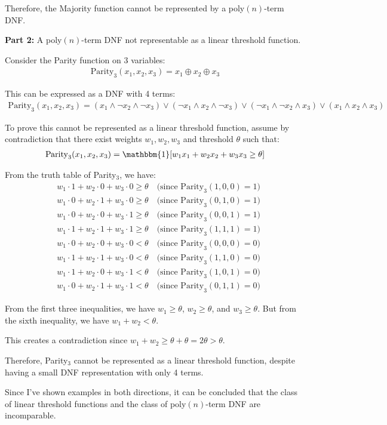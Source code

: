 \documentclass[11pt]{article}
\DeclareMathOperator{\1}{\mathbbm{1}}
\begin{document}
\begin{problem} [15 points]
Therefore, the Majority function cannot be represented by a poly$(n)$-term DNF.

\textbf{Part 2:} A poly$(n)$-term DNF not representable as a linear threshold function.

Consider the Parity function on 3 variables:
\begin{align}
\text{Parity}_3(x_1, x_2, x_3) = x_1 \oplus x_2 \oplus x_3
\end{align}

This can be expressed as a DNF with 4 terms:
\begin{align}
\text{Parity}_3(x_1, x_2, x_3) = (x_1 \land \lnot x_2 \land \lnot x_3) \lor (\lnot x_1 \land x_2 \land \lnot x_3) \lor (\lnot x_1 \land \lnot x_2 \land x_3) \lor (x_1 \land x_2 \land x_3)
\end{align}

To prove this cannot be represented as a linear threshold function, assume by contradiction that there exist weights $w_1, w_2, w_3$ and threshold $\theta$ such that:
\begin{align}
\text{Parity}_3(x_1, x_2, x_3) = \1[w_1 x_1 + w_2 x_2 + w_3 x_3 \geq \theta]
\end{align}

From the truth table of Parity$_3$, we have:
\begin{align}
&w_1 \cdot 1 + w_2 \cdot 0 + w_3 \cdot 0 \geq \theta \quad \text{(since Parity}_3(1,0,0) = 1\text{)} \\
&w_1 \cdot 0 + w_2 \cdot 1 + w_3 \cdot 0 \geq \theta \quad \text{(since Parity}_3(0,1,0) = 1\text{)} \\
&w_1 \cdot 0 + w_2 \cdot 0 + w_3 \cdot 1 \geq \theta \quad \text{(since Parity}_3(0,0,1) = 1\text{)} \\
&w_1 \cdot 1 + w_2 \cdot 1 + w_3 \cdot 1 \geq \theta \quad \text{(since Parity}_3(1,1,1) = 1\text{)} \\
&w_1 \cdot 0 + w_2 \cdot 0 + w_3 \cdot 0 < \theta \quad \text{(since Parity}_3(0,0,0) = 0\text{)} \\
&w_1 \cdot 1 + w_2 \cdot 1 + w_3 \cdot 0 < \theta \quad \text{(since Parity}_3(1,1,0) = 0\text{)} \\
&w_1 \cdot 1 + w_2 \cdot 0 + w_3 \cdot 1 < \theta \quad \text{(since Parity}_3(1,0,1) = 0\text{)} \\
&w_1 \cdot 0 + w_2 \cdot 1 + w_3 \cdot 1 < \theta \quad \text{(since Parity}_3(0,1,1) = 0\text{)}
\end{align}

From the first three inequalities, we have $w_1 \geq \theta$, $w_2 \geq \theta$, and $w_3 \geq \theta$.
But from the sixth inequality, we have $w_1 + w_2 < \theta$.

This creates a contradiction since $w_1 + w_2 \geq \theta + \theta = 2\theta > \theta$.

Therefore, Parity$_3$ cannot be represented as a linear threshold function, despite having a small DNF representation with only 4 terms.

Since I've shown examples in both directions, it can be concluded that the class of linear threshold functions and the class of poly$(n)$-term DNF are incomparable.
\end{problem}
\end{document}
